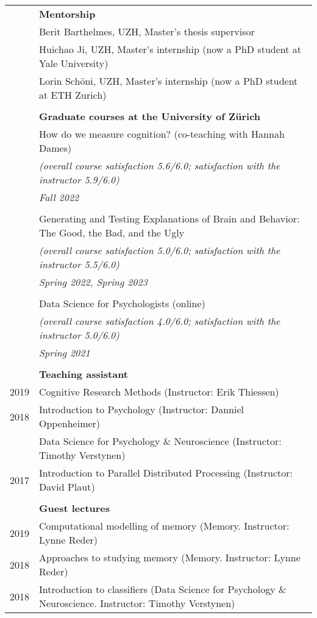 \documentclass[letterpaper]{article}
\begin{document}
\begin{longtable}{rl}
& \textbf{Mentorship}\\[6pt]
& Berit Barthelmes, UZH, Master's thesis supervisor\\
& Huichao Ji, UZH, Master's internship (now a PhD student at Yale University)\\
& Lorin Schöni, UZH, Master's internship (now a PhD student at ETH Zurich)\\
&\\
& \textbf{Graduate courses at the University of Zürich}\\[6pt]
& How do we measure cognition? (co-teaching with Hannah Dames)\\
& {\it (overall course satisfaction 5.6/6.0; satisfaction with the instructor 5.9/6.0)}\\
& {\it Fall 2022}\\
&\\
& Generating and Testing Explanations of Brain and Behavior: The Good, the Bad, and the Ugly\\
& {\it (overall course satisfaction 5.0/6.0; satisfaction with the instructor 5.5/6.0)}\\
& {\it Spring 2022, Spring 2023}\\
&\\
& Data Science for Psychologists (online) \\
& {\it (overall course satisfaction 4.0/6.0; satisfaction with the instructor 5.0/6.0)}\\
& {\it Spring 2021}\\
&\\
& \textbf{Teaching assistant}\\[6pt]
2019 & Cognitive Research Methods (Instructor: Erik Thiessen)\\
2018 & Introduction to Psychology (Instructor: Danniel Oppenheimer)\\
& Data Science for Psychology \& Neuroscience (Instructor: Timothy Verstynen) \\
2017 & Introduction to Parallel Distributed Processing (Instructor:  David Plaut) \\
&\\
& \textbf{Guest lectures}\\[6pt]
2019 & Computational modelling of memory (Memory. Instructor: Lynne Reder)\\
2018 & Approaches to studying memory (Memory. Instructor: Lynne Reder)\\
2018 & Introduction to classifiers (Data Science for Psychology \& Neuroscience. Instructor: Timothy Verstynen) \\

\end{longtable}
\end{document}
